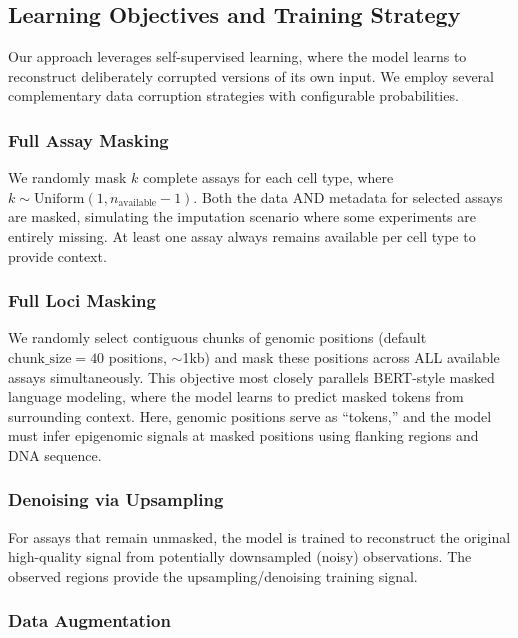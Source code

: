 \subsection{Learning Objectives and Training Strategy}

Our approach leverages self-supervised learning, where the model learns to reconstruct deliberately corrupted versions of its own input. We employ several complementary data corruption strategies with configurable probabilities.

\subsubsection{Full Assay Masking}

We randomly mask $k$ complete assays for each cell type, where $k \sim \text{Uniform}(1, n_{\text{available}} - 1)$. Both the data AND metadata for selected assays are masked, simulating the imputation scenario where some experiments are entirely missing. At least one assay always remains available per cell type to provide context.

\subsubsection{Full Loci Masking}

We randomly select contiguous chunks of genomic positions (default $\text{chunk\_size} = 40$ positions, $\sim$1kb) and mask these positions across ALL available assays simultaneously. This objective most closely parallels BERT-style masked language modeling, where the model learns to predict masked tokens from surrounding context. Here, genomic positions serve as ``tokens,'' and the model must infer epigenomic signals at masked positions using flanking regions and DNA sequence.

\subsubsection{Denoising via Upsampling}

For assays that remain unmasked, the model is trained to reconstruct the original high-quality signal from potentially downsampled (noisy) observations. The observed regions provide the upsampling/denoising training signal.

\subsubsection{Data Augmentation}

